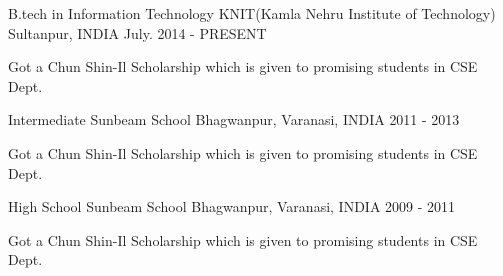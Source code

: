 

\begin{cventries}

  \cventry
    {B.tech in Information Technology}
    {KNIT(Kamla Nehru Institute of Technology)}
    {Sultanpur, INDIA}
    {July. 2014 - PRESENT}
    {
      \begin{cvitems}
        \item {Got a Chun Shin-Il Scholarship which is given to promising students in CSE Dept.}
      \end{cvitems}
    }
    \cventry
    {Intermediate}
    {Sunbeam School}
    {Bhagwanpur, Varanasi, INDIA}
    {2011 - 2013}
    {
      \begin{cvitems}
        \item {Got a Chun Shin-Il Scholarship which is given to promising students in CSE Dept.}
      \end{cvitems}
    }
    \cventry
    {High School}
    {Sunbeam School}
    {Bhagwanpur, Varanasi, INDIA}
    {2009 - 2011}
    {
      \begin{cvitems}
        \item {Got a Chun Shin-Il Scholarship which is given to promising students in CSE Dept.}
      \end{cvitems}
    }
\end{cventries}
